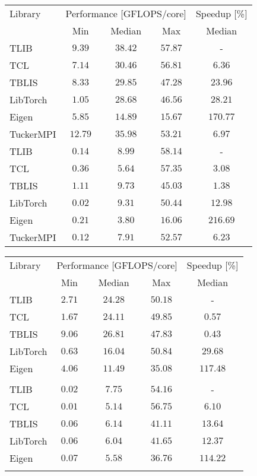 \centering
\footnotesize
\begin{tabular}{lccc c}
	\toprule
	Library    & \multicolumn{3}{c}{Performance [GFLOPS/core]} & Speedup [\%] \\ 
	\cmidrule(lr){2-4} \cmidrule(lr){5-5}
	& Min   & Median  & Max & Median \\ 
	\midrule
	TLIB       & $9.39$  & $\mathbf{38.42}$   & $\mathbf{57.87}$ &  - \\
	TCL        & $7.14$  & $30.46$   & $56.81$ & $6.36$     \\
	TBLIS      & $8.33$  & $29.85$   & $47.28$ & $23.96$     \\
	LibTorch   & $1.05$  & $28.68$   & $46.56$ & $28.21$     \\
	Eigen      & $5.85$  & $14.89$   & $15.67$ & $170.77$     \\
	TuckerMPI  &$\mathbf{12.79}$  & $35.98$   & $53.21$ & $6.97$ \\
	\midrule
	TLIB       & $0.14$  & $8.99$    & $\mathbf{58.14}$ &  -     \\
	TCL        & $0.36$  & $5.64$    & $57.35$ & $3.08$ \\
	TBLIS      & $\mathbf{1.11}$  & $\mathbf{9.73}$  & $45.03$ & $1.38$     \\
	LibTorch   & $0.02$  & $9.31$    & $50.44$ & $12.98$     \\
	Eigen      & $0.21$  & $3.80$    & $16.06$ & $216.69$     \\
	TuckerMPI  & $0.12$  & $7.91$    & $52.57$ & $6.23$ \\
	\bottomrule
\end{tabular}
\hspace{5em}
\begin{tabular}{lccc c}
	\toprule
	Library    & \multicolumn{3}{c}{Performance [GFLOPS/core]} & Speedup [\%] \\ 
	\cmidrule(lr){2-4} \cmidrule(lr){5-5}
	& Min   & Median  & Max  & Median \\ 
	\midrule
	TLIB       & $2.71$  & $24.28$   & $50.18$ &   -   \\
	TCL        & $1.67$  & $24.11$   & $49.85$ & $0.57$     \\
	TBLIS      & $\mathbf{9.06}$  & $\mathbf{26.81}$  & $47.83$ & $0.43$     \\
	LibTorch   & $0.63$  & $16.04$   & $\mathbf{50.84}$ & $29.68$     \\
	Eigen      & $4.06$  & $11.49$   & $35.08$ & $117.48$     \\
	& & & & \\
	\midrule
	TLIB       & $0.02$  & $\mathbf{7.75}$  & $54.16$ &  -  \\
	TCL        & $0.01$  & $5.14$    & $\mathbf{56.75}$ & $6.10$     \\
	TBLIS      & $0.06$  & $6.14$    & $41.11$ & $13.64$     \\
	LibTorch   & $0.06$  & $6.04$ & $41.65$ & $12.37$     \\
	Eigen      & $\mathbf{0.07}$  & $5.58$  & $36.76$ & $114.22$     \\
	& & & & \\
	\bottomrule
\end{tabular}